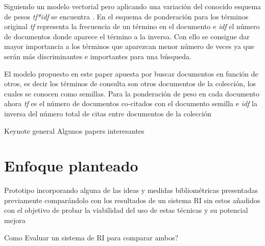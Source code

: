 Siguiendo un modelo vectorial pero aplicando una variación del conocido esquema de pesos \textit{tf*idf} se encuentra \cite{DBLP:conf/ecir/White16}. En el esquema de ponderación para los términos original \textit{tf} representa la frecuencia de un término en el documento e \textit{idf} el número de documentos donde aparece el término a la inversa. Con ello se consigue dar mayor importancia a los términos que aparezcan menor número de veces ya que serán más discriminantes e importantes para una búsqueda.

El modelo propuesto en este paper apuesta por buscar documentos en función de otros, es decir los términos de consulta son otros documentos de la colección, los cuales se conocen como semillas. Para la ponderación de peso en cada documento ahora \textit{tf} es el número de documentos co-citados con el documento semilla e \textit{idf} la inversa del número total de citas entre documentos de la colección

\cite{DBLP:conf/ecir/SarolLS18}

Keynote general
Algunos papers interesantes
\section{Enfoque planteado}

Prototipo incorporando alguna de las ideas y medidas bibliométricas presentadas previamente comparándolo con los resultados de un sistema \acrshort{RI} sin estos añadidos con el objetivo de probar la viabilidad del uso de estas técnicas y su potencial mejora

Como Evaluar un sistema de RI para comparar ambos?



